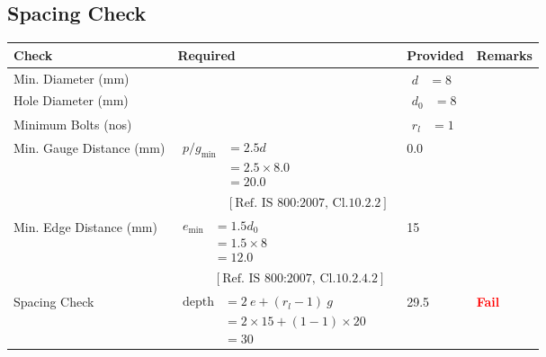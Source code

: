 \documentclass{article}%
\begin{document}
%
%
\subsection{Spacing Check}%
\label{subsec:SpacingCheck}%
\renewcommand{\arraystretch}{1.2}%
\begin{longtable}{|p{2.5cm}|p{7.5cm}|p{3cm}|p{2.5cm}|}%
\hline%
\rowcolor{OsdagGreen}%
Check&Required&Provided&Remarks\\%
\hline%
\endhead%
\hline%
Min. Diameter (mm)&&$\begin{aligned} d &=8 \end{aligned}$&\textcolor{OsdagGreen}{ 
\textbf{}
}\\%
\hline%
Hole Diameter (mm)& &$\begin{aligned} d_0 &=8 \end{aligned}$&\textcolor{OsdagGreen}{ 
\textbf{}
}\\%
\hline%
Minimum Bolts (nos)& &$\begin{aligned} r_l &=1 \end{aligned}$&\textcolor{OsdagGreen}{ 
\textbf{}
}\\%
\hline%
Min. Gauge Distance (mm)&$\begin{aligned} p/g_{\min}&= 2.5 d\\ &=2.5 \times8.0\\&=20.0\\ \\ & [\text{Ref. IS 800:2007, Cl.10.2.2}] \end{aligned}$&0.0&\textcolor{OsdagGreen}{ 
\textbf{}
}\\%
\hline%
Min. Edge Distance (mm)&$\begin{aligned}e_{\min} &= 1.5 d_0 \\ &= 1.5\times8\\ &=12.0\\ \\ & [\text{Ref. IS 800:2007, Cl.10.2.4.2}] \end{aligned}$&15&\textcolor{OsdagGreen}{ 
\textbf{}
}\\%
\hline%
Spacing Check&$\begin{aligned} \text{depth} & = 2~e + (r_l -1)~g\\ & = 2 \times 15+(1-1)\times20\\ & = 30\end{aligned}$&29.5&\textcolor{Red}{ 
\textbf{Fail}
}\\%
\hline%
\end{longtable}
\end{document}
